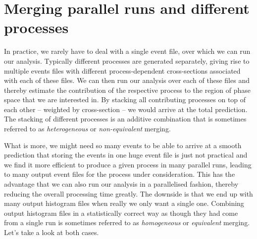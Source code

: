 \documentclass[10pt,fleqn]{scrartcl}
\theoremstyle{exstyle}
\begin{document}
%
%

\section{Merging parallel runs and different processes}

In practice, we rarely have to deal with a single event file, 
over which we can run our analysis. Typically different processes
are generated separately, giving rise to multiple events files
with different process-dependent cross-sections associated with 
each of these files. We can then run our analysis over each of
these files and thereby estimate the contribution of the respective
process to the region of phase space that we are interested in. 
By stacking all contributing processes on top of each other
-- weighted by cross-section -- we would arrive at the total prediction.
The stacking of different processes is an additive combination that is 
sometimes referred to as \emph{heterogeneous} or \emph{non-equivalent} merging.

What is more, we might need so many events
to be able to arrive at a smooth prediction that storing
the events in one huge event file is just not practical
and we find it more efficient to produce a given process
in many parallel runs, leading to many output event files 
for the process under consideration.
This has the advantage that we can also run our analysis
in a parallelised fashion, thereby reducing the overall
processing time greatly.
The downside is that we end up with many output histogram
files when really we only want a single one. Combining output
histogram files in a statistically correct way as though 
they had come from a single run is sometimes referred to
as \emph{homogeneous} or \emph{equivalent} merging.
Let's take a look at both cases.
\end{document}
